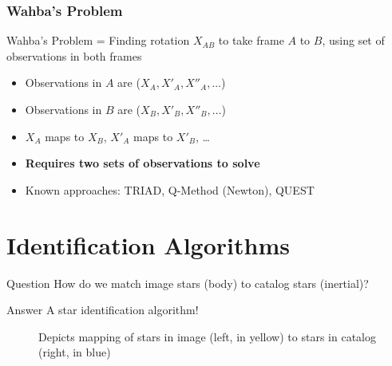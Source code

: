 \documentclass[11pt]{beamer}
\begin{document}
    \begin{frame}
        \frametitle{Wahba's Problem}
        \begin{definition}
            Wahba's Problem = Finding rotation $X_{AB}$ to take frame $A$ to $B$, using set of observations in both
            frames
        \end{definition} \bigskip
        \begin{itemize}
            \item Observations in $A$ are ($X_A, X'_A, X''_A, \ldots$) \medskip
            \item Observations in $B$ are ($X_B, X'_B, X''_B, \ldots$) \medskip
            \item $X_A$ maps to $X_B$, $X'_A$ maps to $X'_B$, \ldots \bigskip \bigskip
            \item \textbf{Requires two sets of observations to solve} \medskip
            \item Known approaches: TRIAD, Q-Method (Newton), QUEST
        \end{itemize}
    \end{frame}


    \section{Identification Algorithms}\label{sec:identificationAlgorithms}
    \begin{frame}
        \begin{block}{Question}
            How do we match image stars (body) to catalog stars (inertial)?
        \end{block}
        \begin{block}{Answer}
            A star identification algorithm!
        \end{block}
        \begin{figure}
            \hspace*{-30pt}
            \caption{Depicts mapping of stars in image (left, in yellow) to stars in catalog (right, in blue)}
        \end{figure}
    \end{frame}
\end{document}
